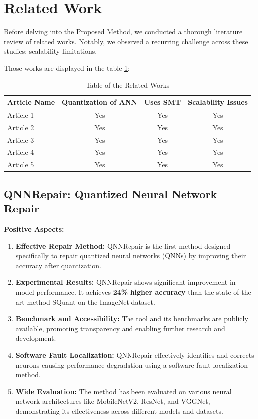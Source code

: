 \documentclass[conference]{IEEEtran}
\begin{document}
\section{Related Work}
Before delving into the Proposed Method, we conducted a thorough literature review of related works. Notably, we observed a recurring challenge across these studies: scalability limitations.

Those works are displayed in the table \ref{tab:summary}:
\begin{table}[h!]
\centering
\begin{tabular}{lccc}
\toprule
\textbf{Article Name} & \textbf{Quantization of ANN} & \textbf{Uses SMT} & \textbf{Scalability Issues} \\
\midrule 
Article 1 \cite{c5} & Yes & Yes & Yes \\
Article 2 \cite{c6} & Yes & Yes & Yes \\
Article 3 \cite{c7} & Yes & Yes & Yes \\
Article 4 \cite{c8}& Yes & Yes & Yes \\
Article 5 \cite{1}& Yes & Yes & Yes \\
\bottomrule
\end{tabular}
\caption{Table of the Related Works}
\label{tab:summary}
\end{table}

\subsection{QNNRepair: Quantized Neural Network Repair \cite{c5}}
\textbf{Positive Aspects:}
\begin{enumerate}
    \item \textbf{Effective Repair Method:} QNNRepair is the first method designed specifically to repair quantized neural networks (QNNs) by improving their accuracy after quantization.
    \item \textbf{Experimental Results:} QNNRepair shows significant improvement in model performance. It achieves \textbf{24\% higher accuracy} than the state-of-the-art method SQuant on the ImageNet dataset.
    \item \textbf{Benchmark and Accessibility:} The tool and its benchmarks are publicly available, promoting transparency and enabling further research and development.
    \item \textbf{Software Fault Localization:} QNNRepair effectively identifies and corrects neurons causing performance degradation using a software fault localization method.
    \item \textbf{Wide Evaluation:} The method has been evaluated on various neural network architectures like MobileNetV2, ResNet, and VGGNet, demonstrating its effectiveness across different models and datasets.
\end{enumerate}
\end{document}
